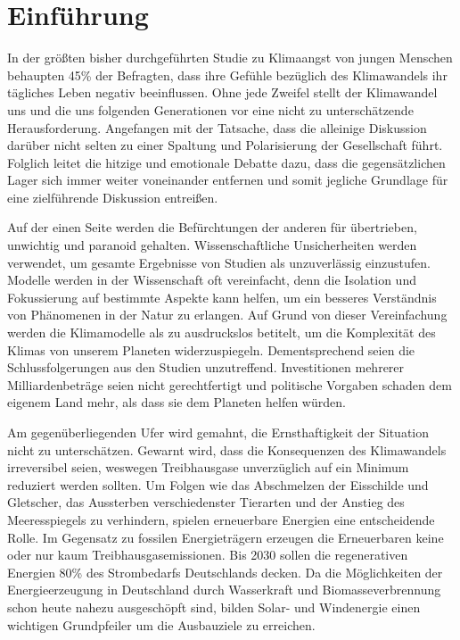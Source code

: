 \documentclass[12pt, a4paper]{article}
\begin{document}
\newpage
\setcounter{section}{0}


\section{Einführung}


In der größten bisher durchgeführten Studie zu Klimaangst von jungen Menschen behaupten 45\% der Befragten, dass ihre Gefühle bezüglich des Klimawandels ihr tägliches Leben negativ beeinflussen. Ohne jede Zweifel stellt der Klimawandel uns und die uns folgenden Generationen vor eine nicht zu unterschätzende Herausforderung. Angefangen mit der Tatsache, dass die alleinige Diskussion darüber nicht selten zu einer Spaltung und Polarisierung der Gesellschaft führt. Folglich leitet die hitzige und emotionale Debatte dazu, dass die gegensätzlichen Lager sich immer weiter voneinander entfernen und somit jegliche Grundlage für eine zielführende Diskussion entreißen.

Auf der einen Seite werden die Befürchtungen der anderen für übertrieben, unwichtig und paranoid gehalten. Wissenschaftliche Unsicherheiten werden verwendet, um gesamte Ergebnisse von Studien als unzuverlässig einzustufen. Modelle werden in der Wissenschaft oft vereinfacht, denn die Isolation und Fokussierung auf bestimmte Aspekte kann helfen, um ein besseres Verständnis von Phänomenen in der Natur zu erlangen. Auf Grund von dieser Vereinfachung werden die Klimamodelle als zu ausdruckslos betitelt, um die Komplexität des Klimas von unserem Planeten widerzuspiegeln. Dementsprechend seien die Schlussfolgerungen aus den Studien unzutreffend. Investitionen mehrerer Milliardenbeträge seien nicht gerechtfertigt und politische Vorgaben schaden dem eigenem Land mehr, als dass sie dem Planeten helfen würden.

Am gegenüberliegenden Ufer wird gemahnt, die Ernsthaftigkeit der Situation nicht zu unterschätzen. Gewarnt wird, dass die Konsequenzen des Klimawandels irreversibel seien, weswegen Treibhausgase unverzüglich auf ein Minimum reduziert werden sollten. Um Folgen wie das Abschmelzen der Eisschilde und Gletscher, das Aussterben verschiedenster Tierarten und der Anstieg des Meeresspiegels zu verhindern, spielen erneuerbare Energien eine entscheidende Rolle. Im Gegensatz zu fossilen Energieträgern erzeugen die Erneuerbaren keine oder nur kaum Treibhausgasemissionen. Bis 2030 sollen die regenerativen Energien 80\% des Strombedarfs Deutschlands decken. Da die Möglichkeiten der Energieerzeugung in Deutschland durch Wasserkraft und Biomasseverbrennung schon heute nahezu ausgeschöpft sind, bilden Solar- und Windenergie einen wichtigen Grundpfeiler um die Ausbauziele zu erreichen. 
\end{document}
